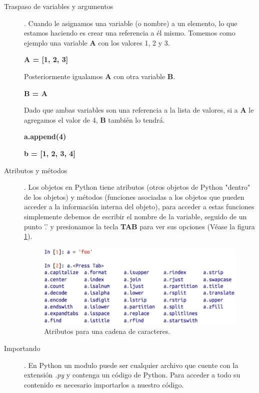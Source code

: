 \documentclass[a4paper]{article}
\begin{document}
\begin{description}
\item[Traspaso de variables y argumentos].
\newline Cuando le asignamos una variable (o nombre) a un elemento, lo que estamos haciendo es crear una referencia a él mismo. Tomemos como ejemplo una variable \textbf{A} con los valores 1, 2 y 3. \newline

\begin{center}
	\textbf{A = [1, 2, 3]}
\end{center}

Posteriormente igualamos \textbf{A} con otra variable \textbf{B}.

\begin{center}
	\textbf{B = A}
\end{center}

Dado que ambas variables son una referencia a la lista de valores, si a \textbf{A} le agregamos el valor de 4, \textbf{B} también lo tendrá.

\begin{center}
	\textbf{a.append(4)}

	\textbf{b = [1, 2, 3, 4]}
\end{center}

\item[Atributos y métodos].
\newline Los objetos en Python tiene atributos (otros objetos de Python "dentro" de los objetos) y métodos (funciones asociadas a los objetos que pueden acceder a la información interna del objeto), para acceder a estas funciones simplemente debemos de escribir el nombre de la variable, seguido de un punto '.' y presionamos la tecla \textbf{TAB} para ver sus opciones (Véase la figura \ref{fig:atributos}).

\begin{figure}[h!]
	\center
	\includegraphics[scale=.7]{./Images/atributos}
	\caption{\label{fig:atributos} Atributos para una cadena de caracteres.}
\end{figure}

\item[Importando].
\newline En Python un modulo puede ser cualquier archivo que cuente con la extensión \textit{.py} y contenga un código de Python. Para acceder a todo su contenido es necesario importarlos a nuestro código.


\end{description}
\end{document}
